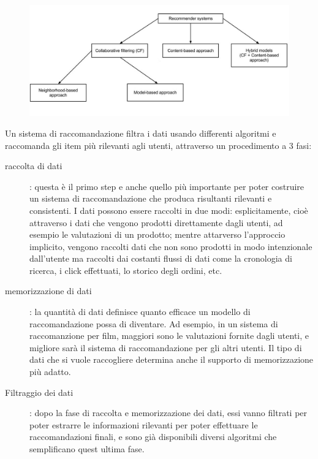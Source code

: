 \begin{figure}[ht!]
	\centering
	\includegraphics[scale=0.5]{images/recommender_systems.jpg}
	\caption{}
	\label{fig:RS}
\end{figure}


\cite{model-based-approach-for-collaborative-filtering}
Un sistema di raccomandazione filtra i dati usando differenti algoritmi e raccomanda gli item più rilevanti agli utenti,
attraverso un procedimento a 3 fasi:

\begin{description}
	\item[raccolta di dati]: questa è il primo step e anche quello più importante per poter costruire un sistema di 
	raccomandazione che produca risultanti rilevanti e consistenti. I dati possono essere raccolti in due modi: esplicitamente,
	cioè attraverso i dati che vengono prodotti direttamente dagli utenti, ad esempio le valutazioni di un prodotto; mentre 
	attarverso l'approccio implicito, vengono raccolti dati che non sono prodotti in modo intenzionale dall'utente ma raccolti
	dai costanti flussi di dati come la cronologia di ricerca, i click effettuati, lo storico degli ordini, etc.
	\item[memorizzazione di dati]: la quantità di dati definisce quanto efficace un modello di raccomandazione possa di
	diventare. Ad esempio, in un sistema di raccomanzione per film, maggiori sono le valutazioni fornite dagli utenti, e 
	migliore sarà il sistema di raccomandazione per gli altri utenti. Il tipo di dati che si vuole raccogliere determina
	anche il supporto di memorizzazione più adatto.   
	\item[Filtraggio dei dati]: dopo la fase di raccolta e memorizzazione dei dati, essi vanno filtrati per poter estrarre
	le informazioni rilevanti per poter effettuare le raccomandazioni finali, e sono già disponibili diversi algoritmi che
	semplificano quest ultima fase. 
\end{description}

